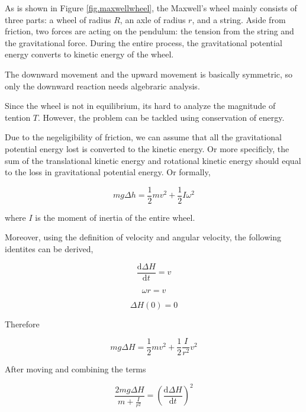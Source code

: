 \documentclass[a4paper]{article}
\begin{document}
As is shown in Figure \ref{fig.maxwellwheel}, the Maxwell's wheel mainly consists of three parts: a wheel of radius $R$, an axle of radius $r$, and a string. Aside from friction, two forces are acting on the pendulum: the tension from the string and the gravitational force. During the entire process, the gravitational potential energy converts to kinetic energy of the wheel. 

The downward movement and the upward movement is basically symmetric, so only the downward reaction needs algebraric analysis.

Since the wheel is not in equilibrium, its hard to analyze the magnitude of tention $T$. However, the problem can be tackled using conservation of energy.

Due to the negeligibility of friction, we can assume that all the gravitational potential energy lost is converted to the kinetic energy. Or more specificly, the sum of the translational kinetic energy and rotational kinetic energy should equal to the loss in gravitational potential energy. Or formally,

\begin{equation}
    mg\Delta h = \frac{1}{2}m v^2 + \frac{1}{2} I \omega ^2
\end{equation}


where $I$ is the moment of inertia of the entire wheel. 

Moreover, using the definition of velocity and angular velocity, the following identites can be derived,

\begin{equation}
    \dfrac{\mathrm{d}\Delta H}{\mathrm{d}t} = v
\end{equation}

\begin{equation}
    \omega r = v
\end{equation}

\begin{equation}
    \Delta H(0) = 0
\end{equation}

Therefore

\begin{equation}
    mg\Delta H = \frac{1}{2}m v^2 + \frac{1}{2} \frac{I}{r^2} v ^2
\end{equation}

After moving and combining the terms

\begin{equation}
    \frac{2mg\Delta H}{m+\frac{I}{r^2}} = (\dfrac{\mathrm{d}\Delta H}{\mathrm{d}t})^2
\end{equation}
\end{document}
